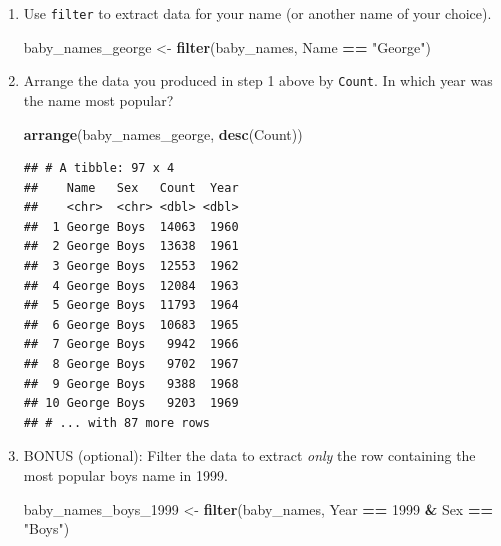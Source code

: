 \documentclass[
]{book}
\newenvironment{Shaded}{\begin{snugshade}}{\end{snugshade}}
\newcommand{\DecValTok}[1]{\textcolor[rgb]{0.00,0.00,0.81}{#1}}
\newcommand{\KeywordTok}[1]{\textcolor[rgb]{0.13,0.29,0.53}{\textbf{#1}}}
\newcommand{\NormalTok}[1]{#1}
\newcommand{\OperatorTok}[1]{\textcolor[rgb]{0.81,0.36,0.00}{\textbf{#1}}}
\newcommand{\StringTok}[1]{\textcolor[rgb]{0.31,0.60,0.02}{#1}}
\begin{document}
\begin{alert}

\begin{enumerate}
\def\labelenumi{\arabic{enumi}.}
\item
  Use \texttt{filter} to extract data for your name (or another name of your choice).

\begin{Shaded}
\begin{Highlighting}[]
\NormalTok{baby\_names\_george \textless{}{-}}\StringTok{ }\KeywordTok{filter}\NormalTok{(baby\_names, Name }\OperatorTok{==}\StringTok{ "George"}\NormalTok{)}
\end{Highlighting}
\end{Shaded}
\item
  Arrange the data you produced in step 1 above by \texttt{Count}. In which year was the name most popular?

\begin{Shaded}
\begin{Highlighting}[]
\KeywordTok{arrange}\NormalTok{(baby\_names\_george, }\KeywordTok{desc}\NormalTok{(Count))}
\end{Highlighting}
\end{Shaded}

\begin{verbatim}
## # A tibble: 97 x 4
##    Name   Sex   Count  Year
##    <chr>  <chr> <dbl> <dbl>
##  1 George Boys  14063  1960
##  2 George Boys  13638  1961
##  3 George Boys  12553  1962
##  4 George Boys  12084  1963
##  5 George Boys  11793  1964
##  6 George Boys  10683  1965
##  7 George Boys   9942  1966
##  8 George Boys   9702  1967
##  9 George Boys   9388  1968
## 10 George Boys   9203  1969
## # ... with 87 more rows
\end{verbatim}
\item
  BONUS (optional): Filter the data to extract \emph{only} the row containing the most popular boys name in 1999.

\begin{Shaded}
\begin{Highlighting}[]
\NormalTok{baby\_names\_boys\_}\DecValTok{1999}\NormalTok{ \textless{}{-}}\StringTok{ }\KeywordTok{filter}\NormalTok{(baby\_names,}
\NormalTok{                               Year }\OperatorTok{==}\StringTok{ }\DecValTok{1999} \OperatorTok{\&}\StringTok{ }\NormalTok{Sex }\OperatorTok{==}\StringTok{ "Boys"}\NormalTok{)}
\end{Highlighting}
\end{Shaded}


\end{enumerate}
\end{alert}
\end{document}
